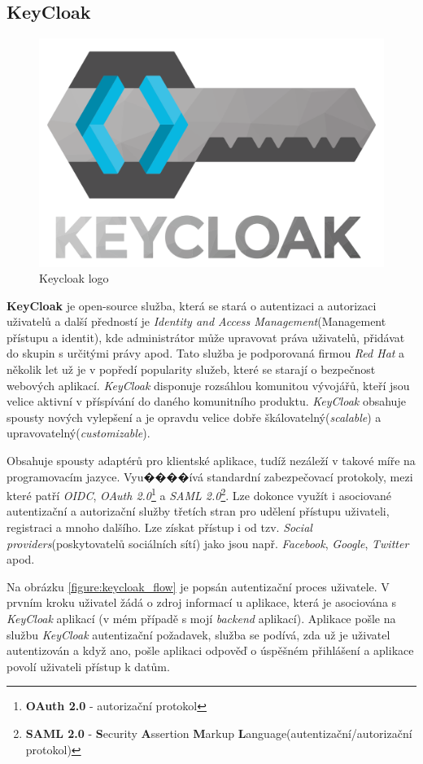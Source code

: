 \subsection*{KeyCloak}
\label{terminy:keycloak}

\begin{figure}[hbt]
  \centering
  \includegraphics[width=.25 \linewidth]{obrazky-figures/keycloak2.png}
  \caption{Keycloak logo}
\end{figure}

\textbf{KeyCloak} je open-source služba, která se stará o autentizaci a autorizaci uživatelů a další předností je \emph{Identity and Access Management}(Management přístupu a identit), kde administrátor může upravovat práva uživatelů, přidávat do skupin s určitými právy apod.
Tato služba je podporovaná firmou \emph{Red Hat} a několik let už je v popředí popularity služeb, které se starají o bezpečnost webových aplikací. \emph{KeyCloak} disponuje rozsáhlou komunitou vývojářů, kteří jsou velice aktivní v příspívání do daného komunitního produktu.
\emph{KeyCloak} obsahuje spousty nových vylepšení a je opravdu velice dobře škálovatelný(\emph{scalable}) a upravovatelný(\emph{customizable}).

Obsahuje spousty adaptérů pro klientské aplikace, tudíž nezáleží v takové míře na programovacím jazyce.
Vyu����ívá standardní zabezpečovací protokoly, mezi které patří \emph{OIDC}, \emph{OAuth 2.0}\footnote{\textbf{OAuth 2.0} - autorizační protokol} a \emph{SAML 2.0}\footnote{\textbf{SAML 2.0} - \textbf{S}ecurity \textbf{A}ssertion \textbf{M}arkup \textbf{L}anguage(autentizační/autorizační protokol)}.
Lze dokonce využít i asociované autentizační a autorizační služby třetích stran pro udělení přístupu uživateli, registraci a mnoho dalšího. Lze získat přístup i od tzv. \emph{Social providers}(poskytovatelů sociálních sítí) jako jsou např. \emph{Facebook}, \emph{Google}, \emph{Twitter} apod.

Na obrázku \ref{figure:keycloak_flow} je popsán autentizační proces uživatele. V prvním kroku uživatel žádá o zdroj informací u aplikace, která je asociována s \emph{KeyCloak} aplikací (v mém případě s mojí \emph{backend} aplikací).
Aplikace pošle na službu \emph{KeyCloak} autentizační požadavek, služba se podívá, zda už je uživatel autentizován a když ano, pošle aplikaci odpověď o úspěšném přihlášení a aplikace povolí uživateli přístup k datům.

